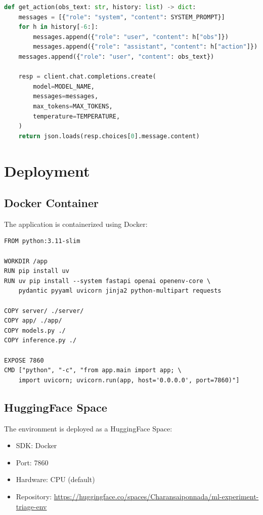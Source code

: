 \documentclass[12pt,a4paper]{article}
\begin{document}
\begin{lstlisting}[language=Python, caption={LLM Action Generation}]
def get_action(obs_text: str, history: list) -> dict:
    messages = [{"role": "system", "content": SYSTEM_PROMPT}]
    for h in history[-6:]:
        messages.append({"role": "user", "content": h["obs"]})
        messages.append({"role": "assistant", "content": h["action"]})
    messages.append({"role": "user", "content": obs_text})
    
    resp = client.chat.completions.create(
        model=MODEL_NAME,
        messages=messages,
        max_tokens=MAX_TOKENS,
        temperature=TEMPERATURE,
    )
    return json.loads(resp.choices[0].message.content)
\end{lstlisting}

\section{Deployment}

\subsection{Docker Container}

The application is containerized using Docker:

\begin{lstlisting}[caption={Dockerfile}]
FROM python:3.11-slim

WORKDIR /app
RUN pip install uv
RUN uv pip install --system fastapi openai openenv-core \
    pydantic pyyaml uvicorn jinja2 python-multipart requests

COPY server/ ./server/
COPY app/ ./app/
COPY models.py ./
COPY inference.py ./

EXPOSE 7860
CMD ["python", "-c", "from app.main import app; \
    import uvicorn; uvicorn.run(app, host='0.0.0.0', port=7860)"]
\end{lstlisting}

\subsection{HuggingFace Space}

The environment is deployed as a HuggingFace Space:

\begin{itemize}
	\item SDK: Docker
	\item Port: 7860
	\item Hardware: CPU (default)
	\item Repository: \url{https://huggingface.co/spaces/Charansaiponnada/ml-experiment-triage-env}
\end{itemize}
\end{document}
